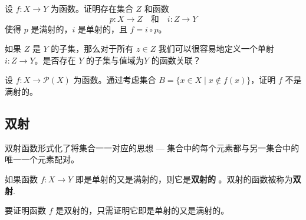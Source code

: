 \begin{exercise}
\label{exEpiMonoFactorisation}
设 $f : X \to Y$ 为函数。证明存在集合 $Z$ 和函数
\[ p : X \to Z \quad \text{和} \quad i : Z \to Y \]
使得 $p$ 是满射的，$i$ 是单射的，且 $f = i \circ p$。
\begin{backhint}
如果 $Z$ 是 $Y$ 的子集，那么对于所有 $z \in Z$ 我们可以很容易地定义一个单射 $i : Z\to Y$。是否存在 $Y$ 的子集与值域为$Y$ 的函数关联？
\end{backhint}
\end{exercise}

\begin{exercise}
设 $f : X \to \mathcal{P}(X)$ 为函数。通过考虑集合 $B = \{ x \in X \mid x \not\in f(x) \}$，证明 $f$ 不是满射的。
\end{exercise}

\subsection*{双射}

双射函数形式化了将集合一一对应的思想 --- 集合中的每个元素都与另一集合中的唯一一个元素配对。

\begin{definition}
\label{defBijective}\label{defBijection}
如果函数 $f : X \to Y$ 即是单射的又是满射的，则它是\textbf{双射的} 。双射的函数被称为\textbf{双射}.
\end{definition}

\begin{prooftip}
要证明函数 $f$ 是双射的，只需证明它即是单射的又是满射的。
\end{prooftip}

